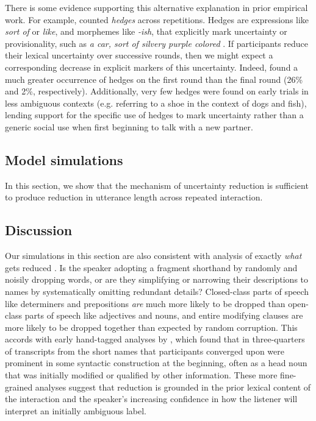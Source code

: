 There is some evidence supporting this alternative explanation in prior empirical work.
For example,  counted \emph{hedges} across repetitions.
Hedges are expressions like \emph{sort of} or \emph{like}, and morphemes like \emph{-ish}, that explicitly mark uncertainty or provisionality, such as \emph{a car, sort of silvery purple colored} \cite{BrennanClark96_ConceptualPactsConversation,Fraser10_Hedging,MedlockBriscoe07_HedgeClassification}.
If participants reduce their lexical uncertainty over successive rounds, then we might expect a corresponding decrease in explicit markers of this uncertainty. 
Indeed,  found a much greater occurrence of hedges on the first round than the final round (26\% and 2\%, respectively).
Additionally, very few hedges were found on early trials in less ambiguous contexts (e.g. referring to a shoe in the context of dogs and fish), lending support for the specific use of hedges to mark uncertainty rather than a generic social use when first beginning to talk with a new partner.

\subsection{Model simulations}

In this section, we show that the mechanism of uncertainty reduction is sufficient to produce reduction in utterance length across repeated interaction.

\subsection{Discussion}

Our simulations in this section are also consistent with analysis of exactly \emph{what} gets reduced \cite{hawkins2020characterizing}.
Is the speaker adopting a fragment shorthand by randomly and noisily dropping words, or are they simplifying or narrowing their descriptions to names by systematically omitting redundant details?
Closed-class parts of speech like determiners and prepositions \emph{are} much more likely to be dropped than open-class parts of speech like adjectives and nouns, and entire modifying clauses are more likely to be dropped together than expected by random corruption.
This accords with early hand-tagged analyses by , which found that in three-quarters of transcripts from  the short names that participants converged upon were prominent in some syntactic construction at the beginning, often as a head noun that was initially modified or qualified by other information. 
These more fine-grained analyses suggest that reduction is grounded in the prior lexical content of the interaction and the speaker's increasing confidence in how the listener will interpret an initially ambiguous label. 

